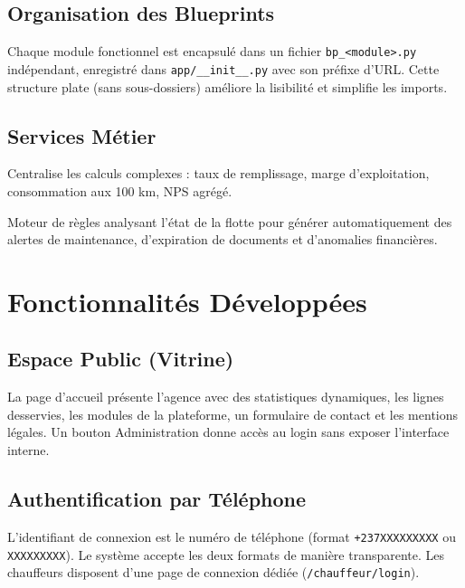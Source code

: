 \documentclass[12pt,a4paper]{report}
\begin{document}
\section{Organisation des Blueprints}

Chaque module fonctionnel est encapsulé dans un fichier \texttt{bp\_<module>.py}
indépendant, enregistré dans \texttt{app/\_\_init\_\_.py} avec son préfixe d'URL.
Cette structure plate (sans sous-dossiers) améliore la lisibilité et simplifie
les imports.

\section{Services Métier}

\begin{description}[leftmargin=2cm]
    \item[\texttt{kpi\_service.py}]
        Centralise les calculs complexes : taux de remplissage, marge d'exploitation,
        consommation aux 100 km, NPS agrégé.
    \item[\texttt{alerte\_service.py}]
        Moteur de règles analysant l'état de la flotte pour générer automatiquement
        des alertes de maintenance, d'expiration de documents et d'anomalies financières.
\end{description}

\chapter{Fonctionnalités Développées}

\section{Espace Public (Vitrine)}
La page d'accueil présente l'agence avec des statistiques dynamiques,
les lignes desservies, les modules de la plateforme, un formulaire de contact
et les mentions légales. Un bouton \og Administration \fg{} donne accès
au login sans exposer l'interface interne.

\section{Authentification par Téléphone}
L'identifiant de connexion est le numéro de téléphone (format \texttt{+237XXXXXXXXX}
ou \texttt{XXXXXXXXX}). Le système accepte les deux formats de manière transparente.
Les chauffeurs disposent d'une page de connexion dédiée (\texttt{/chauffeur/login}).
\end{document}
